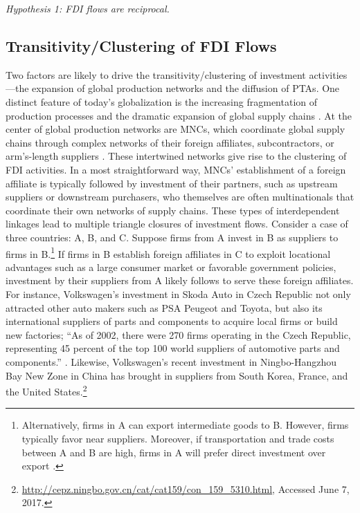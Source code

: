 \documentclass[reqno,onecolumn,letterpaper,12pt]{article}
\begin{document}
\begin{center}
\textit{Hypothesis 1: FDI flows are reciprocal.}
\end{center}


\subsection{Transitivity/Clustering of FDI Flows}
Two factors are likely to drive the transitivity/clustering of investment activities---the expansion of global production networks and the diffusion of PTAs.  One distinct feature of today's globalization is the increasing fragmentation of production processes and the dramatic expansion of global supply chains \citep{UNCTAD:2013}. At the center of global production networks are MNCs, which coordinate global supply chains through complex networks of their foreign affiliates, subcontractors, or arm's-length suppliers \citep[xxii]{UNCTAD:2013}. These intertwined networks give rise to the clustering of FDI activities. In a most straightforward way, MNCs' establishment of a foreign affiliate is typically followed by investment of their partners, such as upstream suppliers or downstream purchasers, who themselves are often multinationals that coordinate their own networks of supply chains. These types of interdependent linkages lead to multiple triangle closures of investment flows. Consider a case of three countries: A, B, and C. Suppose firms from A invest in B as suppliers to firms in B.\footnote{Alternatively, firms in A can export intermediate goods to B. However, firms typically favor near suppliers. Moreover, if transportation and trade costs between A and B are high, firms in A will prefer direct investment over export \citep{Carr_et_al:2001}. } If firms in B establish foreign affiliates in C to exploit locational advantages such as a large consumer market or favorable government policies, investment by their suppliers from A likely follows to serve these foreign affiliates. For instance, Volkswagen's investment in Skoda Auto in Czech Republic not only attracted other auto makers such as PSA Peugeot and Toyota, but also its international suppliers of parts and components to acquire local firms or build new factories; ``As of 2002, there were 270 firms operating in the Czech Republic, representing 45 percent of the top 100 world suppliers of automotive parts and components.'' \citep[352]{Kaminski_Javorcik:2005}. Likewise, Volkswagen's recent investment in Ningbo-Hangzhou Bay New Zone in China has brought in suppliers from South Korea, France, and the United States.\footnote{\url{http://cepz.ningbo.gov.cn/cat/cat159/con_159_5310.html}, Accessed June 7, 2017.}
\end{document}
